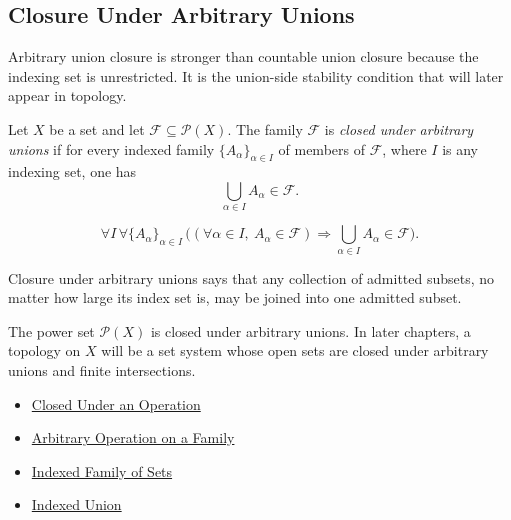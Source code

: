 \subsection{Closure Under Arbitrary Unions}

\begin{remark*}[Exposition]
Arbitrary union closure is stronger than countable union closure because the
indexing set is unrestricted.  It is the union-side stability condition that
will later appear in topology.
\end{remark*}

\begin{definition}\label{def:closed-under-arbitrary-unions}
Let \(X\) be a set and let \(\mathcal{F}\subseteq\mathcal{P}(X)\).  The family
\(\mathcal{F}\) is \emph{closed under arbitrary unions} if for every indexed
family \(\{A_\alpha\}_{\alpha\in I}\) of members of \(\mathcal{F}\), where
\(I\) is any indexing set, one has
\[
  \bigcup_{\alpha\in I} A_\alpha \in \mathcal{F}.
\]
\end{definition}

\begin{remark*}
\[
  \forall I\,\forall \{A_\alpha\}_{\alpha\in I}\,
  \bigl((\forall \alpha\in I,\ A_\alpha\in\mathcal{F})
  \Rightarrow
  \bigcup_{\alpha\in I}A_\alpha\in\mathcal{F}\bigr).
\]
\end{remark*}

\begin{remark*}[Interpretation]
Closure under arbitrary unions says that any collection of admitted subsets,
no matter how large its index set is, may be joined into one admitted subset.
\end{remark*}

\begin{remark*}[Examples]
The power set \(\mathcal{P}(X)\) is closed under arbitrary unions.  In later
chapters, a topology on \(X\) will be a set system whose open sets are closed
under arbitrary unions and finite intersections.
\end{remark*}

\begin{dependencies}
\begin{itemize}
  \item \hyperref[def:closed-under-operation]{Closed Under an Operation}
  \item \hyperref[def:arbitrary-operation-on-family]{Arbitrary Operation on a Family}
  \item \hyperref[def:indexed-family]{Indexed Family of Sets}
  \item \hyperref[def:indexed-union]{Indexed Union}
\end{itemize}
\end{dependencies}
